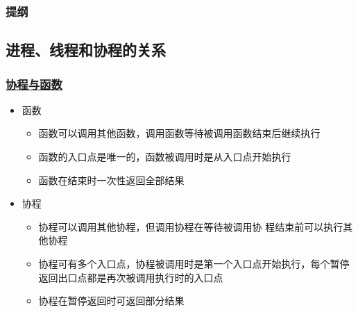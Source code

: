 % 
\begin{frame}
\frametitle{提纲} %
\tableofcontents %
\end{frame}
\subsection{进程、线程和协程的关系}
% 
\begin{frame}[fragile]
    \frametitle{\href{https://zh.wikipedia.org/wiki/\%E5\%8D\%8F\%E7\%A8\%8B}{协程与函数}}

    \begin{itemize}
        \item 函数
    \begin{itemize}
        \item 函数可以调用其他函数，调用函数等待被调用函数结束后继续执行
        \item 函数的入口点是唯一的，函数被调用时是从入口点开始执行
        \item 函数在结束时一次性返回全部结果
    \end{itemize}
    \end{itemize}
    \begin{itemize}
        \item 协程
    \begin{itemize}
        \item 协程可以调用其他协程，但调用协程在等待被调用协 程结束前可以执行其他协程
        \item 协程可有多个入口点，协程被调用时是第一个入口点开始执行，每个暂停返回出口点都是再次被调用执行时的入口点
        \item 协程在暂停返回时可返回部分结果
    \end{itemize}
    \end{itemize}

% 

\end{frame}
